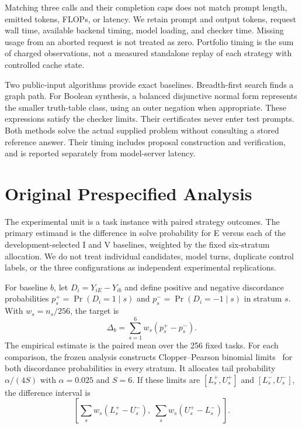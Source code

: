 Matching three calls and their completion caps does not match prompt length, emitted tokens, FLOPs, or latency. We retain prompt and output tokens, request wall time, available backend timing, model loading, and checker time. Missing usage from an aborted request is not treated as zero. Portfolio timing is the sum of charged observations, not a measured standalone replay of each strategy with controlled cache state.

Two public-input algorithms provide exact baselines. Breadth-first search finds a graph path. For Boolean synthesis, a balanced disjunctive normal form represents the smaller truth-table class, using an outer negation when appropriate. These expressions satisfy the checker limits. Their certificates never enter test prompts. Both methods solve the actual supplied problem without consulting a stored reference answer. Their timing includes proposal construction and verification, and is reported separately from model-server latency.

\section{Original Prespecified Analysis}
\label{sec:analysis}

The experimental unit is a task instance with paired strategy outcomes. The primary estimand is the difference in solve probability for E versus each of the development-selected I and V baselines, weighted by the fixed six-stratum allocation. We do not treat individual candidates, model turns, duplicate control labels, or the three configurations as independent experimental replications.

For baseline $b$, let $D_i=Y_{iE}-Y_{ib}$ and define positive and negative discordance probabilities $p_s^+=\Pr(D_i=1\mid s)$ and $p_s^-=\Pr(D_i=-1\mid s)$ in stratum $s$. With $w_s=n_s/256$, the target is
\begin{equation}
\Delta_b=\sum_{s=1}^{6} w_s(p_s^+-p_s^-).
\end{equation}
The empirical estimate is the paired mean over the 256 fixed tasks. For each comparison, the frozen analysis constructs Clopper--Pearson binomial limits~\cite{clopper1934limits} for both discordance probabilities in every stratum. It allocates tail probability $\alpha/(4S)$ with $\alpha=0.025$ and $S=6$. If these limits are $[L_s^+,U_s^+]$ and $[L_s^-,U_s^-]$, the difference interval is
\begin{equation}
\left[\sum_s w_s(L_s^+-U_s^-),\;\sum_s w_s(U_s^+-L_s^-)\right].
\label{eq:interval}
\end{equation}

